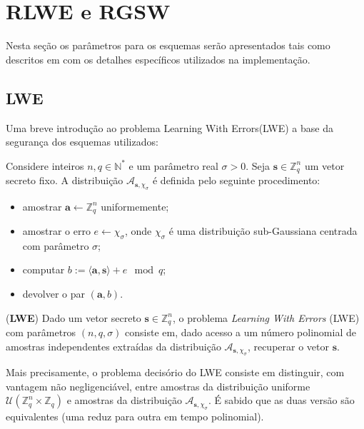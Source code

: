 \section{RLWE e RGSW} 

Nesta seção os parâmetros para os esquemas serão apresentados tais como descritos em \cite{lw23I} com 
os detalhes específicos utilizados na implementação. 

\subsection{LWE}
Uma breve introdução ao problema Learning With Errors(LWE) a base da segurança dos esquemas utilizados:

\begin{definition}
Considere inteiros $n, q \in \mathbb{N}^*$ e um parâmetro real $\sigma > 0$. Seja $\mathbf{s} \in \mathbb{Z}_q^n$ um vetor secreto fixo. A distribuição $\mathcal{A}_{\mathbf{s}, \chi_\sigma}$ é definida pelo seguinte procedimento:

\begin{itemize}
    \item amostrar $\mathbf{a} \leftarrow \mathbb{Z}_q^n$ uniformemente;
    \item amostrar o erro $e \leftarrow \chi_\sigma$, onde $\chi_\sigma$ é uma distribuição sub-Gaussiana centrada com parâmetro $\sigma$;
    \item computar $b := \langle \mathbf{a}, \mathbf{s} \rangle + e \mod q$;
    \item devolver o par $(\mathbf{a}, b)$.
\end{itemize}
\end{definition}

\begin{definition}
(\textbf{LWE}) Dado um vetor secreto $\mathbf{s} \in \mathbb{Z}_q^n$, o problema \emph{Learning With Errors} (LWE) com parâmetros 
$(n, q, \sigma)$ consiste em, dado acesso a um número polinomial de amostras independentes extraídas da distribuição 
$\mathcal{A}_{\mathbf{s}, \chi_\sigma}$, recuperar o vetor $\mathbf{s}$.

Mais precisamente, o problema decisório do LWE consiste em distinguir, com vantagem não negligenciável, entre amostras da distribuição uniforme $\mathcal{U}(\mathbb{Z}_q^n \times \mathbb{Z}_q)$ 
e amostras da distribuição $\mathcal{A}_{\mathbf{s}, \chi_\sigma}$. É sabido que as duas versão são equivalentes (uma reduz para outra em tempo polinomial).
\end{definition}

